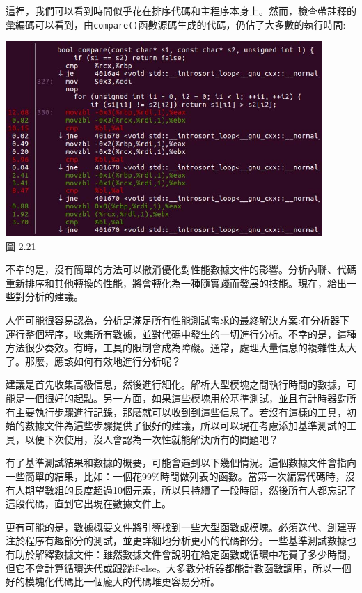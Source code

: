這裡，我們可以看到時間似乎花在排序代碼和主程序本身上。然而，檢查帶註釋的彙編碼可以看到，由\texttt{compare()}函數源碼生成的代碼，仍佔了大多數的執行時間:

\begin{center}
\includegraphics[width=0.9\textwidth]{content/1/chapter2/images/21.jpg}\\
圖 2.21
\end{center}

不幸的是，沒有簡單的方法可以撤消優化對性能數據文件的影響。分析內聯、代碼重新排序和其他轉換的性能，將會轉化為一種隨實踐而發展的技能。現在，給出一些對分析的建議。


人們可能很容易認為，分析是滿足所有性能測試需求的最終解決方案:在分析器下運行整個程序，收集所有數據，並對代碼中發生的一切進行分析。不幸的是，這種方法很少奏效。有時，工具的限制會成為障礙。通常，處理大量信息的複雜性太大了。那麼，應該如何有效地進行分析呢？

建議是首先收集高級信息，然後進行細化。解析大型模塊之間執行時間的數據，可能是一個很好的起點。另一方面，如果這些模塊用於基準測試，並且有計時器對所有主要執行步驟進行記錄，那麼就可以收到到這些信息了。若沒有這樣的工具，初始的數據文件為這些步驟提供了很好的建議，所以可以現在考慮添加基準測試的工具，以便下次使用，沒人會認為一次性就能解決所有的問題吧？

有了基準測試結果和數據的概要，可能會遇到以下幾個情況。這個數據文件會指向一些簡單的結果，比如：一個花99\%時間做列表的函數。當第一次編寫代碼時，沒有人期望數組的長度超過10個元素，所以只持續了一段時間，然後所有人都忘記了這段代碼，直到它出現在數據文件上。

更有可能的是，數據概要文件將引導找到一些大型函數或模塊。必須迭代、創建專注於程序有趣部分的測試，並更詳細地分析更小的代碼部分。一些基準測試數據也有助於解釋數據文件：雖然數據文件會說明在給定函數或循環中花費了多少時間，但它不會計算循環迭代或跟蹤if-else。大多數分析器都能計數函數調用，所以一個好的模塊化代碼比一個龐大的代碼堆更容易分析。


